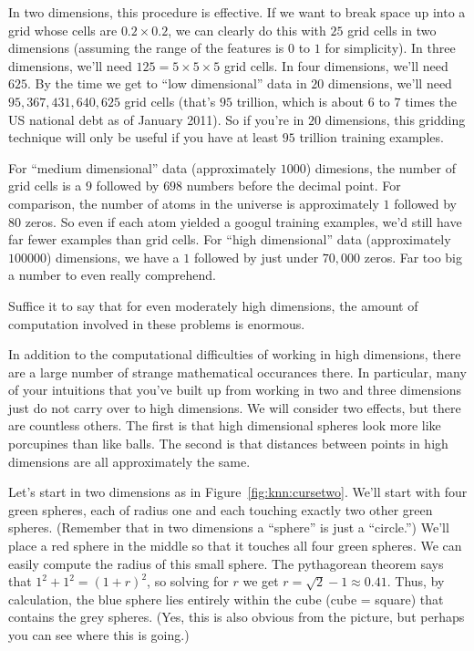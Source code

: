 In two dimensions, this procedure is effective.  If we want to break
space up into a grid whose cells are $0.2 \times 0.2$, we can clearly
do this with $25$ grid cells in two dimensions (assuming the range of
the features is $0$ to $1$ for simplicity).  In three dimensions,
we'll need $125 = 5 \times 5 \times 5$ grid cells.  In four
dimensions, we'll need $625$.  By the time we get to ``low
dimensional'' data in $20$ dimensions, we'll need $95,367,431,640,625$
grid cells (that's $95$ trillion, which is about $6$ to $7$ times the
US national debt as of January 2011).  So if you're in $20$
dimensions, this gridding technique will only be useful if you have at
least $95$ trillion training examples.

For ``medium dimensional'' data (approximately $1000$) dimesions, the
number of grid cells is a $9$ followed by $698$ numbers before the
decimal point.  For comparison, the number of atoms in the universe is
approximately $1$ followed by $80$ zeros.  So even if each atom
yielded a googul training examples, we'd still have far fewer
examples than grid cells.  For ``high dimensional'' data
(approximately $100000$) dimensions, we have a $1$ followed by just
under $70,000$ zeros.  Far too big a number to even really comprehend.

Suffice it to say that for even moderately high dimensions, the amount
of computation involved in these problems is enormous.


In addition to the computational difficulties of working in high
dimensions, there are a large number of strange mathematical
occurances there.  In particular, many of your intuitions that you've
built up from working in two and three dimensions just do not carry
over to high dimensions.  We will consider two effects, but there are
countless others.  The first is that high dimensional spheres look
more like porcupines than like balls.
The second is that distances between points in high dimensions are all
approximately the same.


Let's start in two dimensions as in Figure~\ref{fig:knn:cursetwo}.
We'll start with four green spheres, each of radius one and each
touching exactly two other green spheres.  (Remember that in two
dimensions a ``sphere'' is just a ``circle.'')  We'll place a red
sphere in the middle so that it touches all four green spheres.  We
can easily compute the radius of this small sphere.  The pythagorean
theorem says that $1^2 + 1^2 = (1+r)^2$, so solving for $r$ we get $r
= \sqrt 2 - 1 \approx 0.41$.  Thus, by calculation, the blue sphere
lies entirely within the cube (cube = square) that contains the grey
spheres.  (Yes, this is also obvious from the picture, but perhaps you
can see where this is going.)

